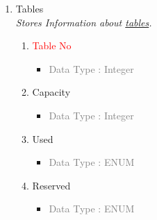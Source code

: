 \begin{enumerate}
        \item Tables \\
        \textit{Stores Information about \underline{tables}.}
            \begin{enumerate}[label=\alph*.]
                \item\textcolor{red}{Table No}
                    \begin{itemize}[label=-]
                        \item \textcolor{gray}{Data Type : Integer}
                    \end{itemize}
                \item Capacity
                    \begin{itemize}[label=-]
                        \item \textcolor{gray}{Data Type : Integer}
                    \end{itemize}
                \item Used
                    \begin{itemize}[label=-]
                        \item \textcolor{gray}{Data Type : ENUM}
                    \end{itemize}
                \item Reserved
                    \begin{itemize}[label=-]
                        \item \textcolor{gray}{Data Type : ENUM}
                    \end{itemize}
            \end{enumerate}
        

\end{enumerate}
